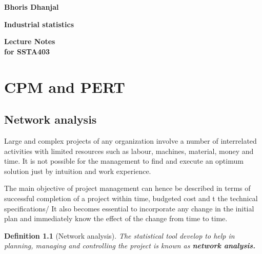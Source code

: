 \documentclass[oneside,11pt,pdftex]{book}%
\numberwithin{equation}{section}
\newtheorem{definition}[theorem]{Definition}
\numberwithin{section}{chapter}
\numberwithin{equation}{chapter}
\begin{document}
\frontmatter

\thispagestyle{empty}
\begin{flushright}
{\LARGE \textbf{Bhoris Dhanjal}}%
\end{flushright}
\vfill
\begin{center}
{\fontsize{29.86truept}{0truept}\selectfont \textbf{Industrial statistics}}%
\end{center}
\vfill
\begin{flushleft}
{\LARGE \textbf{Lecture Notes}} \\
\hspace{-1.75truept}
{\large \textbf{for SSTA403}}
\end{flushleft}
\newpage

\tableofcontents


\mainmatter

\chapter{CPM and PERT}
\section{Network analysis}
Large and complex projects of any organization involve a number of interrelated activities with limited resources such as labour, machines, material, money and time. It is not possible for the management to find and execute an optimum solution just by intuition and work experience.
\par 
The main objective of project management can hence be described in terms of successful completion of a project within time, budgeted cost and t the technical specifications/ It also becomes essential to incorporate any change in the initial plan and immediately know the effect of the change from time to time.
\par
\begin{definition}[Network analysis]\label{def:netanal}
	The statistical tool develop to help in planning, managing and controlling the project is known as \textbf{network analysis.}
\end{definition}
\end{document}
